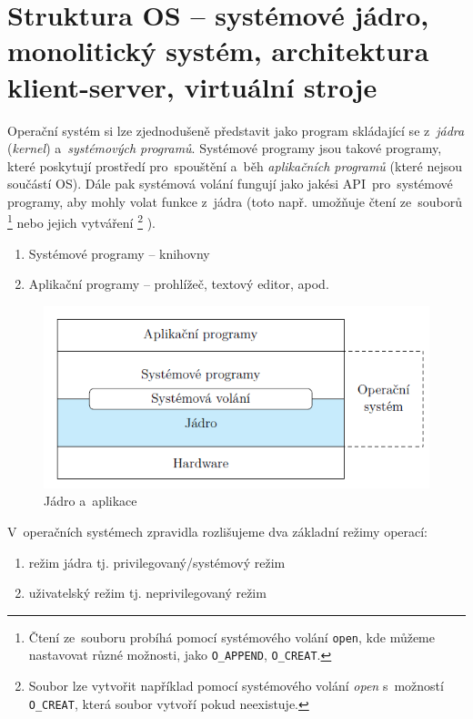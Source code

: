 
\section{Struktura OS -- systémové jádro, monolitický systém, architektura klient-server, virtuální stroje}
\label{kernel}

Operační systém si lze zjednodušeně představit jako program skládající se z~\emph{jádra} (\emph{kernel}) a~\emph{systémových programů}. Systémové programy jsou takové programy, které poskytují prostředí pro~spouštění a~běh \emph{aplikačních programů} (které nejsou součástí OS). Dále pak systémová volání fungují jako jakési API~pro~systémové programy, aby mohly volat funkce z~jádra (toto např. umožňuje čtení ze~souborů%
\footnote{Čtení ze~souboru probíhá pomocí systémového volání \texttt{open}, kde můžeme nastavovat různé možnosti, jako \texttt{O\_APPEND}, \texttt{O\_CREAT}.} %
nebo jejich vytváření%
\footnote{Soubor lze vytvořit například pomocí systémového volání \emph{open} s~možností \texttt{O\_CREAT}, která soubor vytvoří pokud neexistuje.}%
).

\begin{enumerate}
	\item Systémové programy -- knihovny
	\item Aplikační programy -- prohlížeč, textový editor, apod.
\end{enumerate}

\begin{figure}[ht]
	\centering
	\includegraphics[scale=1]{images/OS_kernel_apps.png}
	\caption{Jádro a~aplikace}
	\label{OS_kernel_apps}
\end{figure}

V~operačních systémech zpravidla rozlišujeme dva základní režimy operací:

\begin{enumerate}
	\item režim jádra tj. privilegovaný/systémový režim
	\item uživatelský režim tj. neprivilegovaný režim
\end{enumerate}

